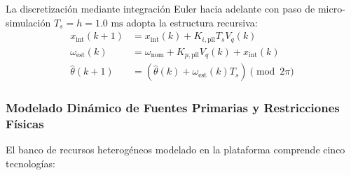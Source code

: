 La discretización mediante integración Euler hacia adelante con paso de micro-simulación $T_s = h = 1.0\text{ ms}$ adopta la estructura recursiva:
\begin{align*}
x_{\text{int}}(k+1) &= x_{\text{int}}(k) + K_{i,\text{pll}} T_s V_q(k) \\
\omega_{\text{est}}(k) &= \omega_{\text{nom}} + K_{p,\text{pll}} V_q(k) + x_{\text{int}}(k) \\
\hat{\theta}(k+1) &= \left(\hat{\theta}(k) + \omega_{\text{est}}(k) T_s \right) \pmod{2\pi}
\end{align*}

\subsubsection{Modelado Dinámico de Fuentes Primarias y Restricciones Físicas}
El banco de recursos heterogéneos modelado en la plataforma comprende cinco tecnologías:
